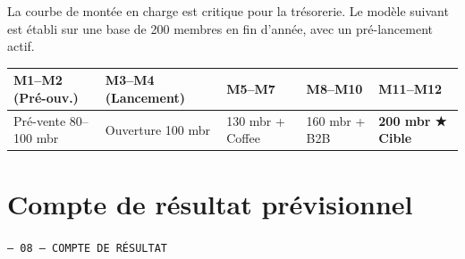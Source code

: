 \documentclass[11pt, a4paper]{article}
\newcommand{\eyebrow}[1]{%
  \vspace{4pt}
  {\small\color{fc-ink3}\texttt{— #1}}
  \vspace{2pt}
}
\newcommand{\redcell}[1]{\textcolor{fc-red}{\textbf{#1}}}
\begin{document}
La courbe de montée en charge est critique pour la trésorerie. Le modèle suivant est établi sur une base de 200 membres en fin d'année, avec un pré-lancement actif.

\begin{center}
\begin{tabular}{@{}p{2.8cm}p{2.5cm}p{2.5cm}p{2.5cm}p{2.5cm}@{}}
\toprule
\rowcolor{fc-ink}\color{white}\textbf{M1–M2 (Pré-ouv.)} & \color{white}\textbf{M3–M4 (Lancement)} & \color{white}\textbf{M5–M7} & \color{white}\textbf{M8–M10} & \color{white}\textbf{M11–M12} \\
\midrule
Pré-vente 80–100 mbr & Ouverture 100 mbr & 130 mbr + Coffee & 160 mbr + B2B & \redcell{200 mbr ★ Cible} \\
\bottomrule
\end{tabular}
\end{center}

\section{Compte de résultat prévisionnel}
\eyebrow{08 — COMPTE DE RÉSULTAT}
\end{document}

